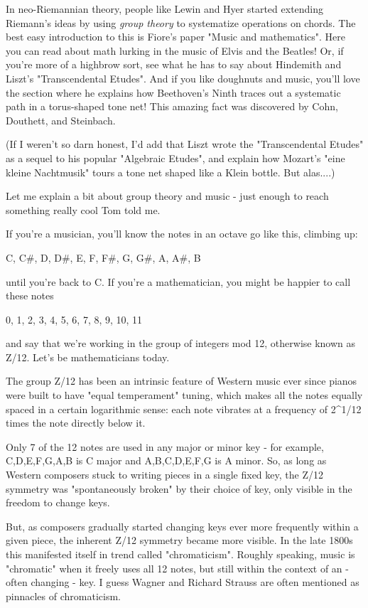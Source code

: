 In neo-Riemannian theory, people like Lewin and Hyer started 
extending Riemann's ideas by using \emph{group theory} to systematize 
operations on chords.  The best easy introduction to this is 
Fiore's paper "Music and mathematics".   Here you can read about 
math lurking in the music of Elvis and the Beatles!  Or, if 
you're more of a highbrow sort, see what he has to say about 
Hindemith and Liszt's "Transcendental Etudes".  And if you 
like doughnuts and music, you'll love the section where he 
explains how Beethoven's Ninth traces out a systematic path in 
a torus-shaped tone net!  This amazing fact was discovered by
Cohn, Douthett, and Steinbach.  

(If I weren't so darn honest, I'd add that Liszt wrote the
"Transcendental Etudes" as a sequel to his popular "Algebraic
Etudes", and explain how Mozart's "eine kleine Nachtmusik" 
tours a tone net shaped like a Klein bottle.  But alas....)

Let me explain a bit about group theory and music - just 
enough to reach something really cool Tom told me.

If you're a musician, you'll know the notes in an octave go
like this, climbing up:

C, C#, D, D#, E, F, F#, G, G#, A, A#, B

until you're back to C.  If you're a mathematician, you might
be happier to call these notes

0, 1, 2, 3, 4, 5, 6, 7, 8, 9, 10, 11

and say that we're working in the group of integers mod 12, 
otherwise known as Z/12.  Let's be mathematicians today.

The group Z/12 has been an intrinsic feature of Western music
ever since pianos were built to have "equal temperament" 
tuning, which makes all the notes equally spaced in a certain 
logarithmic sense: each note vibrates at a frequency of 2^{1/12}
times the note directly below it.  

Only 7 of the 12 notes are used in any major or minor key - 
for example, C,D,E,F,G,A,B is C major and A,B,C,D,E,F,G is 
A minor.  So, as long as Western composers stuck to writing 
pieces in a single fixed key, the Z/12 symmetry was "spontaneously 
broken" by their choice of key, only visible in the freedom to 
change keys.  

But, as composers gradually started changing keys ever more
frequently within a given piece, the inherent Z/12 symmetry 
became more visible.   In the late 1800s this manifested itself
in trend called "chromaticism".   Roughly speaking, music is 
"chromatic" when it freely uses all 12 notes, but still within 
the context of an - often changing - key.  I guess Wagner and
Richard Strauss are often mentioned as pinnacles of chromaticism.

